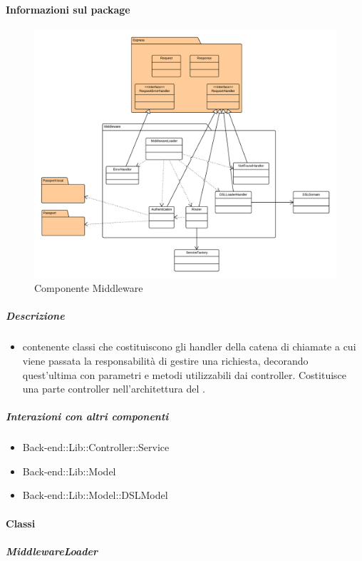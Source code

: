 	\paragraph{Informazioni sul package} 
		\begin{figure}[H] 
			\begin{center} 
				\includegraphics[width=\textwidth]{uml/package/Back-end::Lib::Controller::Middleware.png}  
				\caption{Componente Middleware}
			\end{center}  
		\end{figure} 
	\subparagraph{Descrizione} 
		\begin{itemize}
		\item[]  contenente classi che costituiscono gli handler della catena di chiamate a cui viene
passata la responsabilità di gestire una richiesta, decorando quest’ultima con parametri e
metodi utilizzabili dai controller. Costituisce una parte controller nell’architettura 
del  .

		\end{itemize} 
	\subparagraph{Interazioni con altri componenti} 
		\begin{itemize} 
				\item Back-end::Lib::Controller::Service
				\item Back-end::Lib::Model
				\item Back-end::Lib::Model::DSLModel  
		\end{itemize} 
		\paragraph{Classi}
			\subparagraph{MiddlewareLoader}
				
